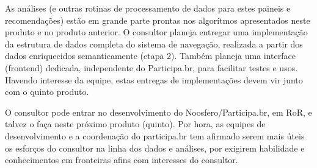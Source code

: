 \documentclass[12pt]{article}
\begin{document}
As análises (e outras rotinas de processamento de dados para estes paineis e recomendações) estão em grande parte prontas nos algorítmos apresentados neste produto e no produto anterior. O consultor planeja entregar uma implementação da estrutura de dados completa do sistema de navegação, realizada a partir dos dados enriquecidos semanticamente (etapa 2). Também planeja uma interface (frontend) dedicada, independente do Participa.br, para facilitar testes e usos. Havendo interesse da equipe, estas entregas de implementações devem vir junto com o quinto produto.

O consultor pode entrar no desenvolvimento do Noosfero/Participa.br, em RoR, e talvez o faça neste próximo produto (quinto). Por hora, as equipes de desenvolvimento e a coordenação do participa.br tem afirmado serem mais úteis os esforços do consultor na linha dos dados e análises, por exigirem habilidade e conhecimentos em fronteiras afins com interesses do consultor.
\end{document}
